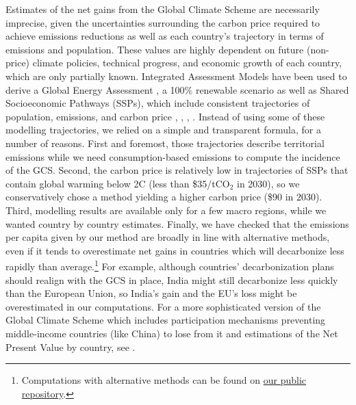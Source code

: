 Estimates of the net gains from the Global Climate Scheme are necessarily imprecise, given the uncertainties surrounding the carbon price required to achieve emissions reductions as well as each country's trajectory in terms of emissions and population. These values are highly dependent on future (non-price) climate policies, technical progress, and economic growth of each country, which are only partially known. Integrated Assessment Models have been used to derive a Global Energy Assessment , a 100\% renewable scenario  as well as Shared Socioeconomic Pathways (SSPs), which include consistent trajectories of population, emissions, and carbon price , , , . Instead of using some of these modelling trajectories, we relied on a simple and transparent formula, for a number of reasons. First and foremost, those trajectories describe territorial emissions while we need consumption-based emissions to compute the incidence of the GCS. Second, the carbon price is relatively low in trajectories of SSPs that contain global warming below 2\textdegree{}C (less than \$35/tCO$_\text{2}$ in 2030), so we conservatively chose a method yielding a higher carbon price (\$90 in 2030). Third, modelling results are available only for a few macro regions, while we wanted country by country estimates. Finally, we have checked that the emissions per capita given by our method are broadly in line with alternative methods, even if it tends to overestimate net gains in countries which will decarbonize less rapidly than average.\footnote{Computations with alternative methods can be found on \href{https://github.com/bixiou/international_attitudes_toward_global_policies/blob/main/code_global/map_GCS_incidence.R}{our public repository}.} For example, although countries' decarbonization plans should realign with the GCS in place, India might still decarbonize less quickly than the European Union, so India's gain and the EU's loss might be overestimated in our computations. For a more sophisticated version of the Global Climate Scheme which includes participation mechanisms preventing middle-income countries (like China) to lose from it and estimations of the Net Present Value by country, see .  %

